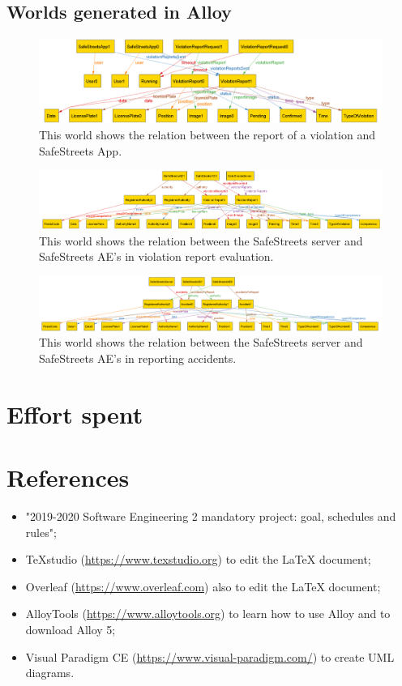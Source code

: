 \documentclass{article}
\begin{document}
		\subsection{Worlds generated in Alloy}
		\begin{figure}[H]
			\centering
			\includegraphics[width=1\textwidth]{images/alloyWorlds/world1.png}
			\caption[World 1]{This world shows the relation between the report of a violation and SafeStreets App.}
			\label{fig:alloy_world1}
		\end{figure}
		\begin{figure}[H]
			\centering
			\includegraphics[width=1\textwidth]{images/alloyWorlds/world2.png}
			\caption[World 2]{This world shows the relation between the SafeStreets server and SafeStreets AE's in violation report evaluation.}
			\label{fig:alloy_world2}
		\end{figure}
		\begin{figure}[H]
			\centering
			\includegraphics[width=1\textwidth]{images/alloyWorlds/world3.png}
			\caption[World 3]{This world shows the relation between the SafeStreets server and SafeStreets AE's in reporting accidents.}
			\label{fig:alloy_world3}
		\end{figure}
		
	\newpage
	\section{Effort spent}
	
	\newpage
	\section{References}
	\begin{itemize}
		\item "2019-2020 Software Engineering 2 mandatory project: goal, schedules and rules";
		\item TeXstudio (\url{https://www.texstudio.org}) to edit the LaTeX document;
		\item Overleaf (\url{https://www.overleaf.com}) also to edit the LaTeX document;
		\item AlloyTools (\url{https://www.alloytools.org}) to learn how to use Alloy and to download Alloy 5;
		\item Visual Paradigm CE (\url{https://www.visual-paradigm.com/}) to create UML diagrams.
	\end{itemize} 
\end{document}
